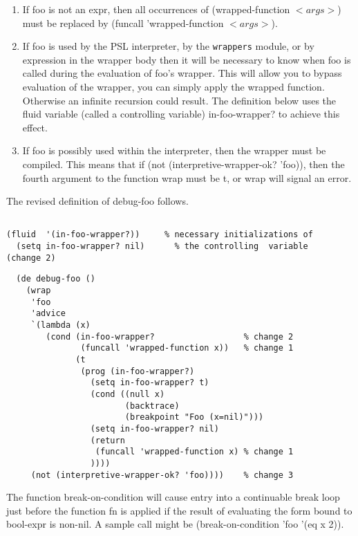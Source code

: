 \begin{enumerate}
\item  If   foo   is   not   an  expr,  then  all  occurrences  of
     (wrapped-function $<args>$)  must  be  replaced  by  (funcall
     'wrapped-function $<args>$).
\item  If  foo  is  used  by  the PSL interpreter, by the {\tt wrappers}
     module, or by expression in the wrapper body then  it  will
     be  necessary  to  know  when  foo  is  called  during  the
     evaluation of foo's wrapper.  This will allow you to bypass
     evaluation of the wrapper, you can simply apply the wrapped
     function.  Otherwise an infinite  recursion  could  result.
     The  definition  below  uses  the  fluid variable (called a
     controlling  variable)  in-foo-wrapper?  to  achieve   this
     effect.
\item  If  foo  is  possibly used within the interpreter, then the
     wrapper  must  be  compiled.  This  means  that   if   (not
     (interpretive-wrapper-ok?  'foo)), then the fourth argument
     to the function wrap must be t,  or  wrap  will  signal  an
     error.
\end{enumerate}

  The revised definition of debug-foo follows.
\begin{verbatim}

(fluid  '(in-foo-wrapper?))     % necessary initializations of 
  (setq in-foo-wrapper? nil)      % the controlling  variable
(change 2)
\end{verbatim}
\begin{verbatim}
  (de debug-foo ()
    (wrap
     'foo
     'advice
     `(lambda (x)
        (cond (in-foo-wrapper?                  % change 2
               (funcall 'wrapped-function x))   % change 1
              (t
               (prog (in-foo-wrapper?)
                 (setq in-foo-wrapper? t)
                 (cond ((null x)
                        (backtrace)
                        (breakpoint "Foo (x=nil)")))
                 (setq in-foo-wrapper? nil)
                 (return
                  (funcall 'wrapped-function x) % change 1
                 ))))
     (not (interpretive-wrapper-ok? 'foo))))    % change 3
\end{verbatim}
  The  function  break-on-condition  will  cause  entry  into  a
continuable break loop just before the function fn is applied if
the result of evaluating the form bound to bool-expr is non-nil.
A sample call might be (break-on-condition 'foo '(eq x 2)).

